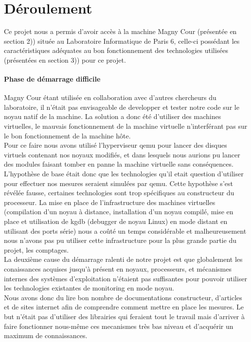   \section*{Déroulement}
    Ce projet nous a permis d'avoir accès à la machine Magny Cour (présentée en
    section 2)) située au Laboratoire Informatique de Paris 6, celle-ci
    possédant les caractéristiques adéquates au bon fonctionnement des
    technologies utilisées (présentées en section 3)) pour ce projet.

    \paragraph{Phase de démarrage difficile}
      Magny Cour étant utilisée en collaboration avec d'autres chercheurs du
      laboratoire, il n'était pas envisageable de developper et tester notre
      code sur le noyau natif de la machine. La solution a donc été d'utiliser
      des machines virtuelles, le mauvais fonctionnement de la machine virtuelle
      n'interférant pas sur le bon fonctionnement de la machine hôte.\\ Pour ce
      faire nous avons utilisé l'hyperviseur qemu pour lancer des disques
      virtuels contenant nos noyaux modifiés, et dans lesquels nous aurions pu
      lancer des modules faisant tomber en panne la machine virtuelle sans
      conséquences. L'hypothèse de base était donc que les technologies qu'il
      etait question d'utiliser pour effectuer nos mesures seraient simulées par
      qemu. Cette hypothèse s'est révélée fausse, certaines technologies sont
      trop spécifiques au constructeur du processeur. La mise en place de
      l'infrastructure des machines virtuelles (compilation d'un noyau à
      distance, installation d'un noyau compilé, mise en place et utilisation de
      kgdb (debugger de noyau Linux) en mode distant en utilisant des ports
      série) nous a coûté un temps considérable et malheureusement nous n'avons
      pas pu utiliser cette infrastructure pour la plus grande partie du projet,
      les comptages.\\ La deuxième cause du démarrage ralenti de notre projet
      est que globalement les conaissances acquises jusqu'à présent en noyaux,
      processeurs, et mécanismes internes des systèmes d'exploitation n'étaient
      pas suffisantes pour pouvoir utiliser les technologies existantes de
      monitoring en mode noyau.\\ Nous avons donc du lire bon nombre de
      documentations constructeur, d'articles et de sites internet afin de
      comprendre comment mettre en place les mesures. Le but n'était pas
      d'utiliser des librairies qui feraient tout le travail mais d'arriver à
      faire fonctionner nous-même ces mecanismes très bas niveau et d'acquérir
      un maximum de connaissances.

